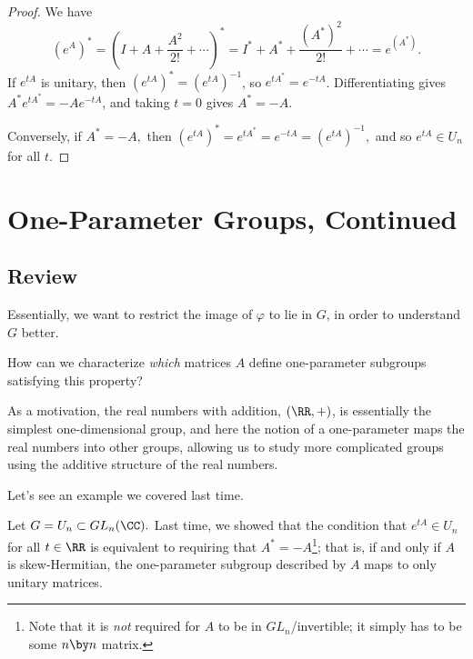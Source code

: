 \begin{proof}
We have 
\[
(e^A)^* = \left(I + A + \frac{A^2}{2!} + \cdots\right)^* = I^* + A^* + \frac{(A^*)^2}{2!} + \cdots  = e^{(A^*)}. 
\]
If $e^{tA}$ is unitary, then $(e^{tA})^* = (e^{tA})^{-1}$, so $e^{tA^*} = e^{-tA}$. Differentiating gives $A^*e^{tA^*} = -Ae^{-tA}$, and taking $t = 0$ gives $A^* = -A$. 

Conversely, if $A^* = -A,$ then $(e^{tA})^* = e^{tA^*} = e^{-tA} = (e^{tA})^{-1},$ and so $e^{tA} \in U_n$ for all $t.$
\end{proof}

\newpage


\section{One-Parameter Groups, Continued}

\subsection{Review}
Essentially, we want to restrict the image of $\varphi$ to lie in $G$, in order to understand $G$ better.

\begin{qq}
How can we characterize \emph{which} matrices $A$ define one-parameter subgroups satisfying this property?
\end{qq}

As a motivation, the real numbers with addition, $(\RR, +)$, is essentially the simplest one-dimensional group, and here the notion of a one-parameter maps the real numbers into other groups, allowing us to study more complicated groups using the additive structure of the real numbers.

Let's see an example we covered last time.
\begin{example}
Let $G = U_n \subset GL_n(\CC).$ Last time, we showed that the condition that $e^{tA} \in U_n$ for all $t \in \RR$ is equivalent to requiring that $A^* = -A$\footnote{Note that it is \emph{not} required for $A$ to be in $GL_n$/invertible; it simply has to be some $n \by n$ matrix.}; that is, if and only if $A$ is skew-Hermitian, the one-parameter subgroup described by $A$ maps to only unitary matrices. %
\end{example}

